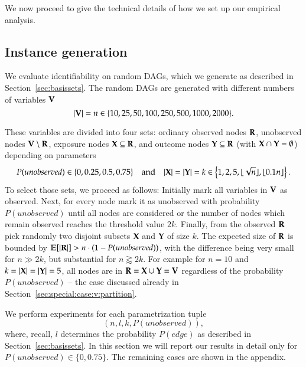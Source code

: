 We now proceed to give the technical details of how we set up our empirical analysis.

%
%
%
%
%
%
%
%


%
%
%
%
%

%
%
%
%
%
%
%
%

%
%
%
%
%
%


%
%
%

%
%
%
%


%


\subsection{Instance generation}\label{sub:sub:sect:parameters}

We evaluate identifiability on random DAGs, which we generate as described in Section~\ref{sec:basissets}. 
The random DAGs are generated with different numbers of variables ${\bf V}$
\[
 |{\bf V}| = n \in \{10, 25, 50, 100, 250, 500, 1000, 2000\}.
\]

These variables are divided %
into four sets: 
ordinary observed nodes ${\bf R}$,
unobserved nodes ${\bf V}\setminus {\bf R}$, 
exposure nodes ${\bf X}\subseteq {\bf R}$, and outcome nodes ${\bf Y}\subseteq {\bf R}$ (with ${\bf X} \cap {\bf Y} = \emptyset$)
depending on parameters
\[ 
   P(\textit{unobserved}) \in \{0, 0.25, 0.5, 0.75\} \quad \text{and}\quad   
  |{\bf X}| = |{\bf Y}| = k \in  \left\{1,2,5,\lfloor \sqrt{n} \rfloor,\lfloor 0.1n \rfloor\right\}.
\]
To select those sets, we proceed as follows: Initially mark all variables in ${\bf V}$ as observed. Next, 
for every node mark it as unobserved with  
probability $P(\textit{unobserved})$ until all nodes are considered or 
the number of nodes which remain observed reaches the threshold value $2k$.
%
%
%
%
%
%
%
%
Finally, from the observed ${\bf R}$ pick randomly two 
disjoint subsets ${\bf X}$ and ${\bf Y}$ of size $k$.
%
%
%
%
The expected size of ${\bf R}$ is bounded by
$\operatorname{\mathbb{E}}[|{\bf R}|] > n\cdot(1-P(\textit{unobserved}))$, with the difference being very small for $n \gg 2k$, but substantial for $n \gtrapprox 2k$.
For example for $n=10$ and $k = |{\bf X}| = |{\bf Y}| = 5$, all nodes 
are in ${\bf R} =  {\bf X} \cup {\bf Y} = {\bf V}$ %
regardless of the probability $P(\textit{unobserved})$ -- the case discussed 
already in Section~\ref{sec:special:case:v:partition}. %

%
%
%
%
%
%
%
%
%
%
%



%
We perform  experiments for each parametrization tuple 
\begin{equation}\label{eq:tuples}
  (n, l, k, P(\textit{unobserved})),
\end{equation}
where, recall, $l$ determines the probability $P(\textit{edge})$
as described in Section~\ref{sec:basissets}. In this section we will 
report our results in detail only for $ P(\textit{unobserved}) \in \{0,0.75\}.$
The remaining cases are shown in  the appendix.

